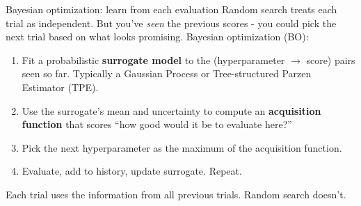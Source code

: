 \documentclass[aspectratio=169]{beamer}
\begin{document}
\begin{frame}{Bayesian optimization: learn from each evaluation}
  Random search treats each trial as independent. But you've \emph{seen} the previous scores - you could pick the next trial based on what looks promising.
  \vfill
  Bayesian optimization (BO):
  \begin{enumerate}
    \item Fit a probabilistic \textbf{surrogate model} to the (hyperparameter $\to$ score) pairs seen so far. Typically a Gaussian Process or Tree-structured Parzen Estimator (TPE).
    \item Use the surrogate's mean and uncertainty to compute an \textbf{acquisition function} that scores ``how good would it be to evaluate here?''
    \item Pick the next hyperparameter as the maximum of the acquisition function.
    \item Evaluate, add to history, update surrogate. Repeat.
  \end{enumerate}
  \vfill
  Each trial uses the information from all previous trials. Random search doesn't.
\end{frame}
\end{document}
